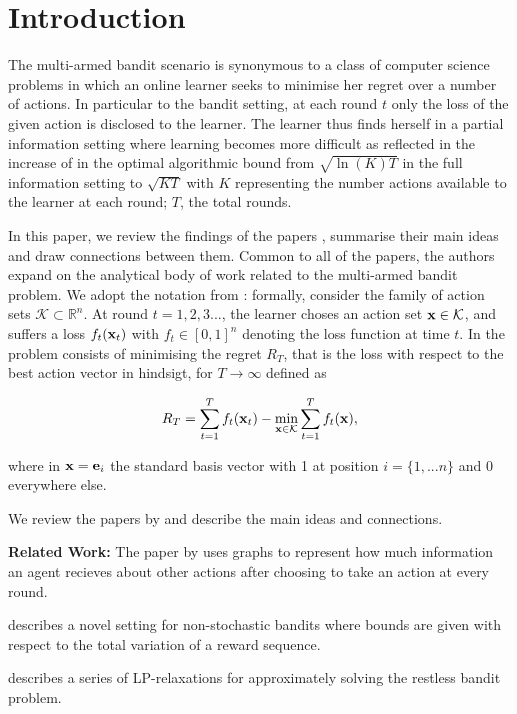 \section{Introduction}

The multi-armed bandit scenario is synonymous to a class of computer science problems in which an online learner seeks to minimise her regret over a number of actions. In particular to the bandit setting, at each round $t$ only the loss of the given action is disclosed to the learner. The learner thus finds herself in a partial information setting where learning becomes more difficult as reflected in the increase of in the optimal algorithmic bound from $\sqrt{\ln(K)T}$ in the full information setting to $\sqrt{KT}$ with $K$ representing the number actions available to the learner at each round; $T$, the total rounds. 

In this paper, we review the findings of the papers \citep{alon, hazan, bertsimas}, summarise their main ideas and draw connections between them. Common to all of the papers, the authors expand on the analytical body of work related to the multi-armed bandit problem. We adopt the notation from \citep{alon, hazan}: formally, consider the family of action sets $\mathcal{K}\subset \mathbb{R}^n$. At round $t=1,2,3...$, the learner choses an action set ${\bf x}\in \mathcal{K}$, and suffers a loss $ f_t({\bf x}_t)$ with $ f_t\in [0,1]^n$ denoting the loss function at time $t$. In \citep{alon, hazan} the problem consists of minimising the regret  $R_T$, that is the loss with respect to the best action vector in hindsigt, for $T\to\infty$ defined as

\begin{align}
	R_T=\sum_{t=1}^Tf_t({\bf x}_t)-\min_{{\bf x}\in \mathcal{K}}\sum_{t=1}^T f_t({\bf x}),
\end{align}

where in \citep{alon} ${\bf x}={\bf e}_i$ the standard basis vector with 1 at position $i=\{1,...n\}$ and 0 everywhere else.

We review the papers by
\citep{alon, hazan, bertsimas} and describe the main ideas and connections. 

\textbf{Related Work:} 
The paper by 
\citep{alon} uses graphs to represent how much information an agent recieves about 
other actions after choosing to take an action at every round. 

\citep{hazan} describes a novel setting for non-stochastic bandits where bounds are given with respect to the total variation of a reward sequence. 

\citep{bertsimas} describes a series of LP-relaxations for approximately solving
the restless bandit problem.
